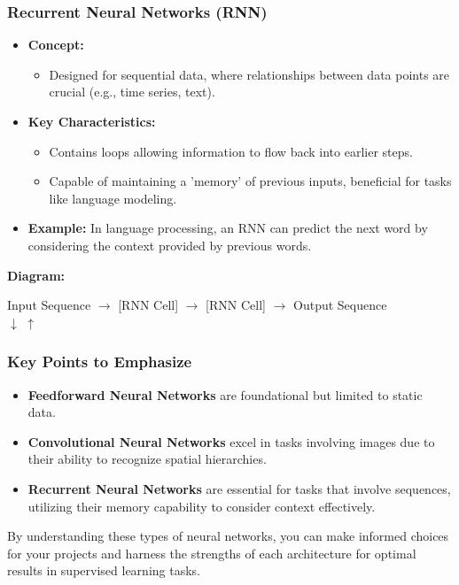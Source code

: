 \documentclass[aspectratio=169]{beamer}
\begin{document}
\begin{frame}[fragile]
  \frametitle{Recurrent Neural Networks (RNN)}
  \begin{itemize}
    \item \textbf{Concept:}
    \begin{itemize}
      \item Designed for sequential data, where relationships between data points are crucial (e.g., time series, text).
    \end{itemize}

    \item \textbf{Key Characteristics:}
    \begin{itemize}
      \item Contains loops allowing information to flow back into earlier steps.
      \item Capable of maintaining a 'memory' of previous inputs, beneficial for tasks like language modeling.
    \end{itemize}

    \item \textbf{Example:}
    In language processing, an RNN can predict the next word by considering the context provided by previous words.
  \end{itemize}

  \vspace{0.5cm}
  \textbf{Diagram:}
  \begin{center}
    Input Sequence $\rightarrow$ [RNN Cell] $\rightarrow$ [RNN Cell] $\rightarrow$ Output Sequence
    \\[0.2cm]
    \quad $\downarrow$ \quad {} \quad $\uparrow$
  \end{center}
\end{frame}

\begin{frame}[fragile]
  \frametitle{Key Points to Emphasize}
  \begin{itemize}
    \item \textbf{Feedforward Neural Networks} are foundational but limited to static data.
    \item \textbf{Convolutional Neural Networks} excel in tasks involving images due to their ability to recognize spatial hierarchies.
    \item \textbf{Recurrent Neural Networks} are essential for tasks that involve sequences, utilizing their memory capability to consider context effectively.
  \end{itemize}

  By understanding these types of neural networks, you can make informed choices for your projects and harness the strengths of each architecture for optimal results in supervised learning tasks.
\end{frame}
\end{document}
